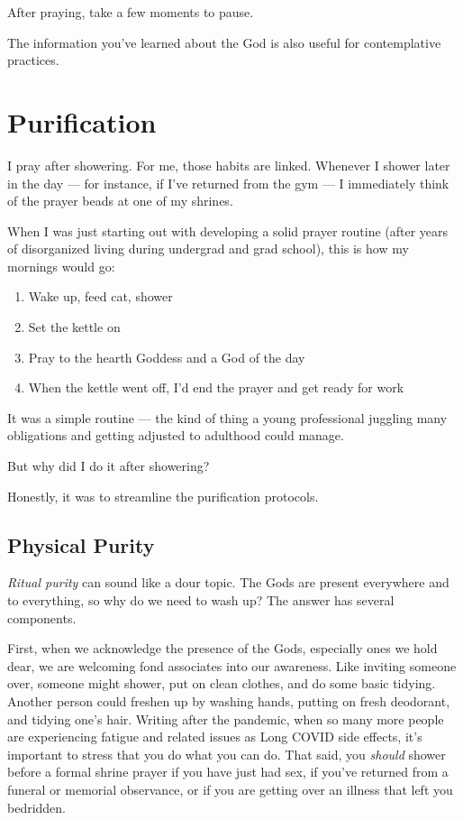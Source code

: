 \documentclass[
]{book}
\providecommand{\tightlist}{%
  \setlength{\itemsep}{0pt}\setlength{\parskip}{0pt}}
\begin{document}
After praying, take a few moments to pause.

The information you've learned about the God is also useful for contemplative practices.

\hypertarget{purification}{%
\chapter{Purification}\label{purification}}

I pray after showering. For me, those habits are linked. Whenever I shower later in the day --- for instance, if I've returned from the gym --- I immediately think of the prayer beads at one of my shrines.

When I was just starting out with developing a solid prayer routine (after years of disorganized living during undergrad and grad school), this is how my mornings would go:

\begin{enumerate}
\def\labelenumi{\arabic{enumi}.}
\tightlist
\item
  Wake up, feed cat, shower
\item
  Set the kettle on
\item
  Pray to the hearth Goddess and a God of the day
\item
  When the kettle went off, I'd end the prayer and get ready for work
\end{enumerate}

It was a simple routine --- the kind of thing a young professional juggling many obligations and getting adjusted to adulthood could manage.

But why did I do it after showering?

Honestly, it was to streamline the purification protocols.

\hypertarget{physical-purity}{%
\section{Physical Purity}\label{physical-purity}}

\emph{Ritual purity} can sound like a dour topic. The Gods are present everywhere and to everything, so why do we need to wash up? The answer has several components.

First, when we acknowledge the presence of the Gods, especially ones we hold dear, we are welcoming fond associates into our awareness. Like inviting someone over, someone might shower, put on clean clothes, and do some basic tidying. Another person could freshen up by washing hands, putting on fresh deodorant, and tidying one's hair. Writing after the pandemic, when so many more people are experiencing fatigue and related issues as Long COVID side effects, it's important to stress that you do what you can do. That said, you \emph{should} shower before a formal shrine prayer if you have just had sex, if you've returned from a funeral or memorial observance, or if you are getting over an illness that left you bedridden.
\end{document}
